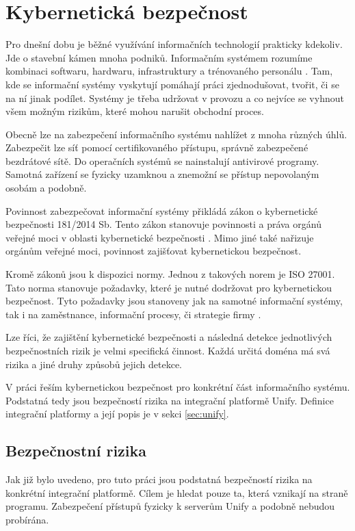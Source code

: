 \documentclass[thesis=M,czech]{FITthesis}[2012/10/20]
\begin{document}
	
	\section{Kybernetická bezpečnost}
		Pro dnešní dobu je běžné využívání informačních technologií prakticky kdekoliv. Jde o stavební kámen mnoha podniků. Informačním systémem rozumíme kombinaci softwaru, hardwaru, infrastruktury a trénovaného personálu \cite{businessdictionary}. Tam, kde  se informační systémy vyskytují pomáhají práci zjednodušovat, tvořit, či se na ní jinak podílet. Systémy je třeba udržovat v provozu a co nejvíce se vyhnout všem možným rizikům, které mohou narušit obchodní proces.
		
		Obecně lze na zabezpečení informačního systému nahlížet z mnoha různých úhlů. Zabezpečit lze síť pomocí certifikovaného přístupu, správně zabezpečené bezdrátové sítě. Do operačních systémů se nainstalují antivirové programy. Samotná zařízení se fyzicky uzamknou a znemožní se přístup nepovolaným osobám  a podobně.
		
		Povinnost zabezpečovat informační systémy přikládá zákon o kybernetické bezpečnosti 181/2014 Sb. Tento zákon stanovuje povinnosti a práva orgánů veřejné moci v oblasti kybernetické bezpečnosti \cite{zakon181-2014}. Mimo jiné také nařizuje orgánům veřejné moci, povinnost zajišťovat kybernetickou bezpečnost.
		
		Kromě zákonů jsou k dispozici normy. Jednou z takových norem je ISO 27001. Tato norma stanovuje požadavky, které je nutné dodržovat pro kybernetickou bezpečnost. Tyto požadavky jsou stanoveny jak na samotné informační systémy, tak i na zaměstnance, informační procesy, či strategie firmy \cite{iso27001}.
		
		Lze říci, že zajištění kybernetické bezpečnosti a následná detekce jednotlivých bezpečnostních rizik je velmi specifická činnost. Každá určitá doména má svá rizika a jiné druhy způsobů jejich detekce. 
		
		V práci řeším kybernetickou bezpečnost pro konkrétní část informačního systému. Podstatná tedy jsou bezpečností rizika na integrační platformě Unify. Definice integrační platformy a její popis je v sekci \ref{sec:unify}.
		
		\subsection{Bezpečnostní rizika}
			Jak již bylo uvedeno, pro tuto práci jsou podstatná bezpečností rizika na konkrétní integrační platformě. Cílem je hledat pouze ta, která vznikají na straně programu. Zabezpečení přístupů fyzicky k serverům Unify a podobně nebudou probírána.
			
\end{document}
